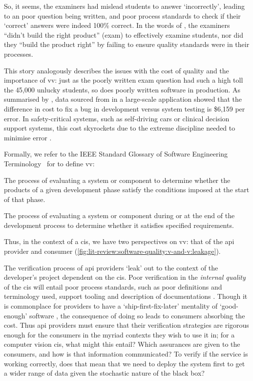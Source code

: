 So, it seems, the examiners had mislead students to answer `incorrectly', leading to an poor question being written, and poor process standards to check if their `correct' answers were indeed 100\% correct. In the words of \citet{Boehm:1981ua}, the examiners ``didn't build the right product'' (exam) to effectively examine students, nor did they ``build the product right'' by failing to ensure quality standards were in their processes. 

This story analogously describes the issues with the cost of quality \citep{Boehm:2005vj} and the importance of \gls{vv}: just as the poorly written exam question had such a high toll the 45,000 unlucky students, so does poorly written software in production. As summarised by \citet{Pressman:2005vf}, data sourced from \citet{Cigital:2003tl} in a large-scale application showed that the difference in cost to fix a bug in development versus system testing is \$6,159 per error. In safety-critical systems, such as self-driving cars or clinical decision support systems, this cost skyrockets due to the extreme discipline needed to minimise error \citep{Tassey:2002vu}.

Formally, we refer to the IEEE Standard Glossary of Software Engineering Terminology~\citep{IEEE:1990wp} for to define \gls{vv}:

\begin{description}[font=\itshape,style=multiline,leftmargin=3cm]
  \item[verification] The process of evaluating a system or component to determine whether the products of a given development phase satisfy the conditions imposed at the start of that phase.
  \item[validation] The process of evaluating a system or component during or at the end of the development process to determine whether it satisfies specified requirements. 
\end{description} 

\noindent
Thus, in the context of a \gls{cis}, we have two perspectives on \gls{vv}: that of the \gls{api} provider and consumer (\cref{fig:lit-review:software-quality:v-and-v:leakage}).

The verification process of \gls{api} providers `leak' out to the context of the developer's project dependent on the \gls{cis}. Poor verification in the \textit{internal quality} of the \gls{cis} will entail poor process standards, such as poor definitions and terminology used, support tooling and description of documentations \citep{Sommerville:2011uc}. Though it is commonplace for providers to have a `ship-first-fix-later' mentality of `good-enough' software , the consequence of doing so leads to consumers absorbing the cost. Thus \gls{api} providers must ensure that their verification strategies are rigorous enough for the consumers in the myriad contexts they wish to use it in; for a computer vision \gls{cis}, what might this entail? Which assurances are given to the consumers, and how is that information communicated? To verify if the service is working correctly, does that mean that we need to deploy the system first to get a wider range of data given the stochastic nature of the black box?

